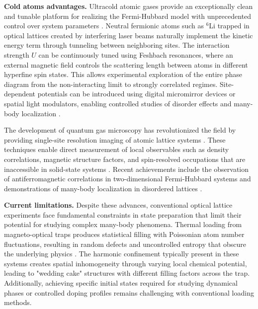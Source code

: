 
\textbf{Cold atoms advantages.} Ultracold atomic gases provide an exceptionally clean and tunable platform for realizing the Fermi-Hubbard model with unprecedented control over system parameters \cite{esslinger_fermi-hubbard_2010,gross_quantum_2017}. Neutral fermionic atoms such as $^6$Li trapped in optical lattices created by interfering laser beams naturally implement the kinetic energy term through tunneling between neighboring sites. The interaction strength $U$ can be continuously tuned using Feshbach resonances, where an external magnetic field controls the scattering length between atoms in different hyperfine spin states. This allows experimental exploration of the entire phase diagram from the non-interacting limit to strongly correlated regimes. Site-dependent potentials can be introduced using digital micromirror devices or spatial light modulators, enabling controlled studies of disorder effects and many-body localization \cite{choi_exploring_2016,schreiber_observation_2015}.

The development of quantum gas microscopy has revolutionized the field by providing single-site resolution imaging of atomic lattice systems \cite{bakr_quantum_2009,sherson_single-atom-resolved_2010}. These techniques enable direct measurement of local observables such as density correlations, magnetic structure factors, and spin-resolved occupations that are inaccessible in solid-state systems \cite{gross_quantum_2021}. Recent achievements include the observation of antiferromagnetic correlations in two-dimensional Fermi-Hubbard systems \cite{mazurenko_cold-atom_2017,parsons_site-resolved_2016} and demonstrations of many-body localization in disordered lattices \cite{bordia_probing_2017}.

\textbf{Current limitations.} Despite these advances, conventional optical lattice experiments face fundamental constraints in state preparation that limit their potential for studying complex many-body phenomena. Thermal loading from magneto-optical traps produces statistical filling with Poissonian atom number fluctuations, resulting in random defects and uncontrolled entropy that obscure the underlying physics \cite{esslinger_fermi-hubbard_2010}. The harmonic confinement typically present in these systems creates spatial inhomogeneity through varying local chemical potential, leading to "wedding cake" structures with different filling factors across the trap. Additionally, achieving specific initial states required for studying dynamical phases or controlled doping profiles remains challenging with conventional loading methods.

